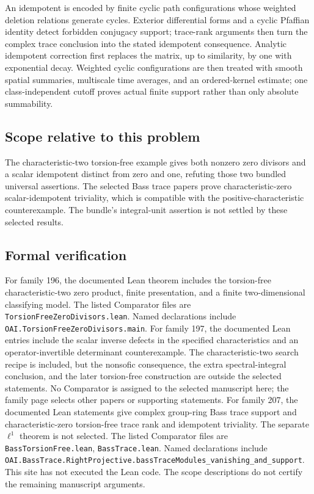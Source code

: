 \documentclass[11pt]{article}
\begin{document}
An idempotent is encoded by finite cyclic path configurations whose weighted deletion relations generate cycles. Exterior differential forms and a cyclic Pfaffian identity detect forbidden conjugacy support; trace-rank arguments then turn the complex trace conclusion into the stated idempotent consequence. Analytic idempotent correction first replaces the matrix, up to similarity, by one with exponential decay. Weighted cyclic configurations are then treated with smooth spatial summaries, multiscale time averages, and an ordered-kernel estimate; one class-independent cutoff proves actual finite support rather than only absolute summability.

\subsection{Scope relative to this problem}
The characteristic-two torsion-free example gives both nonzero zero divisors and a scalar idempotent distinct from zero and one, refuting those two bundled universal assertions. The selected Bass trace papers prove characteristic-zero scalar-idempotent triviality, which is compatible with the positive-characteristic counterexample. The bundle's integral-unit assertion is not settled by these selected results.

\subsection{Formal verification}
For family 196, the documented Lean theorem includes the torsion-free characteristic-two zero product, finite presentation, and a finite two-dimensional classifying model. The listed Comparator files are \texttt{TorsionFreeZeroDivisors.lean}. Named declarations include \texttt{OAI.TorsionFreeZeroDivisors.main}. For family 197, the documented Lean entries include the scalar inverse defects in the specified characteristics and an operator-invertible determinant counterexample. The characteristic-two search recipe is included, but the nonsofic consequence, the extra spectral-integral conclusion, and the later torsion-free construction are outside the selected statements. No Comparator is assigned to the selected manuscript here; the family page selects other papers or supporting statements. For family 207, the documented Lean statements give complex group-ring Bass trace support and characteristic-zero torsion-free trace rank and idempotent triviality. The separate $\ell^1$ theorem is not selected. The listed Comparator files are \texttt{BassTorsionFree.lean}, \texttt{BassTrace.lean}. Named declarations include \texttt{OAI.BassTrace.RightProjective.bassTraceModules\_vanishing\_and\_support}. This site has not executed the Lean code. The scope descriptions do not certify the remaining manuscript arguments.
\end{document}
